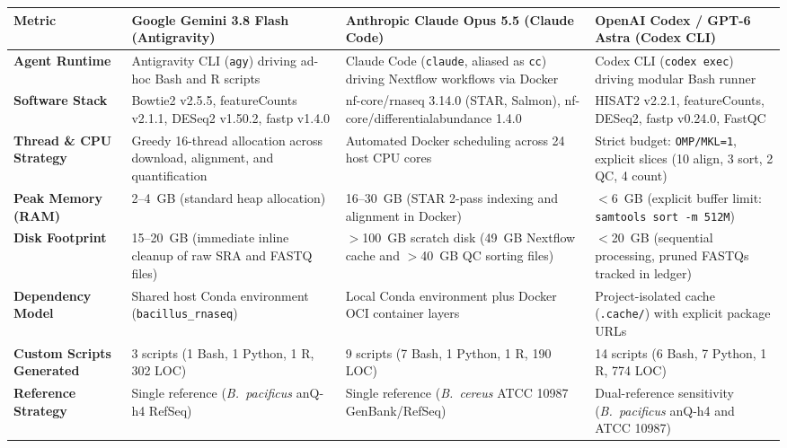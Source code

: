 \documentclass[11pt,letterpaper]{article}
\newcommand{\tool}[1]{\textsf{#1}}
\begin{document}
\clearpage

\begin{table}[!htbp]
\centering
\footnotesize
\begin{tabularx}{\textwidth}{p{2.8cm}XXX}
\toprule
\textbf{Metric} & \textbf{Google Gemini 3.8 Flash (Antigravity)} & \textbf{Anthropic Claude Opus 5.5 (Claude Code)} & \textbf{OpenAI Codex / GPT-6 Astra (Codex CLI)} \\
\midrule
\textbf{Agent Runtime} & Antigravity CLI (\texttt{agy}) driving ad-hoc Bash and R scripts & Claude Code (\texttt{claude}, aliased as \texttt{cc}) driving \tool{Nextflow} workflows via Docker & Codex CLI (\texttt{codex exec}) driving modular Bash runner \\
\addlinespace
\textbf{Software Stack} & \tool{Bowtie2} v2.5.5, \tool{featureCounts} v2.1.1, \tool{DESeq2} v1.50.2, \tool{fastp} v1.4.0 & \tool{nf-core/rnaseq} 3.14.0 (\tool{STAR}, \tool{Salmon}), \tool{nf-core/differentialabundance} 1.4.0 & \tool{HISAT2} v2.2.1, \tool{featureCounts}, \tool{DESeq2}, \tool{fastp} v0.24.0, \tool{FastQC} \\
\addlinespace
\textbf{Thread \& CPU Strategy} & Greedy 16-thread allocation across download, alignment, and quantification & Automated Docker scheduling across 24 host CPU cores & Strict budget: \texttt{OMP/MKL=1}, explicit slices (10 align, 3 sort, 2 QC, 4 count) \\
\addlinespace
\textbf{Peak Memory (RAM)} & 2--4~GB (standard heap allocation) & 16--30~GB (\tool{STAR} 2-pass indexing and alignment in Docker) & $<$6~GB (explicit buffer limit: \texttt{samtools sort -m 512M}) \\
\addlinespace
\textbf{Disk Footprint} & 15--20~GB (immediate inline cleanup of raw SRA and FASTQ files) & $>$100~GB scratch disk (49~GB \tool{Nextflow} cache and $>$40~GB QC sorting files) & $<$20~GB (sequential processing, pruned FASTQs tracked in ledger) \\
\addlinespace
\textbf{Dependency Model} & Shared host Conda environment (\texttt{bacillus\_rnaseq}) & Local Conda environment plus Docker OCI container layers & Project-isolated cache (\texttt{.cache/}) with explicit package URLs \\
\addlinespace
\textbf{Custom Scripts Generated} & 3 scripts (1 Bash, 1 Python, 1 R, 302 LOC) & 9 scripts (7 Bash, 1 Python, 1 R, 190 LOC) & 14 scripts (6 Bash, 7 Python, 1 R, 774 LOC) \\
\addlinespace
\textbf{Reference Strategy} & Single reference (\textit{B.~pacificus} anQ-h4 RefSeq) & Single reference (\textit{B.~cereus} ATCC 10987 GenBank/RefSeq) & Dual-reference sensitivity (\textit{B.~pacificus} anQ-h4 and ATCC 10987) \\

\end{tabularx}
\end{table}
\end{document}
